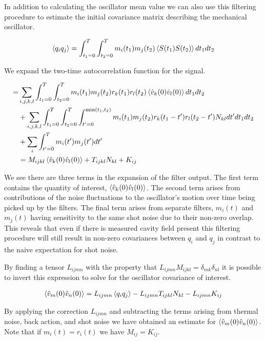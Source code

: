 \documentclass[12pt]{article}
\newcommand{\nn}{\nonumber}
\begin{document}
In addition to calculating the oscillator mean value we can also use this filtering procedure to estimate the initial covariance matrix describing the mechanical oscillator.

\begin{align}
\Braket{q_i q_j} = \int_{t_1=0}^T \int_{t_2=0}^T m_i(t_1)m_j(t_2) \Braket{S(t_1)S(t_2)} dt_1 dt_2
\end{align}

We expand the two-time autocorrelation function for the signal.

\begin{align}
=& \sum_{i,j,k,l} \int_{t_1=0}^T \int_{t_2=0}^T m_i(t_1) m_j(t_2) r_k(t_1) r_l(t_2) \Braket{\hat{v}_k(0) \hat{v}_l(0)} dt_1 dt_2\\
&+ \sum_{i,j,k,l} \int_{t_1=0}^T \int_{t_2=0}^T  \int_{t'=0}^{\text{min}(t_1,t_2)} m_i(t_1) m_j(t_2) r_k(t_1-t') r_l(t_2-t') N_{kl} dt' dt_1 dt_2 \nn\\
&+ \sum_i \int_{t'=0}^T m_i(t')m_j(t') dt' \nn \\
&= M_{ijkl} \Braket{\hat{v}_k(0) \hat{v}_l(0)} +  T_{ijkl}N_{kl} + K_{ij} \nn
\end{align}

We see there are three terms in the expansion of the filter output. The first term contains the quantity of interest, $\Braket{\hat{v}_k(0) \hat{v}_l(0)}$. 
The second term arises from contributions of the noise fluctuations to the oscillator's motion over time being picked up by the filters. 
The final term arises from separate filters, $m_i(t)$ and $m_j(t)$ having sensitivity to the same shot noise due to their non-zero overlap. This reveals that even if there is measured cavity field present this filtering procedure will still result in non-zero covariances between $q_i$ and $q_j$ in contrast to the naive expectation for shot noise.

By finding a tensor $L_{ijmn}$ with the property that $L_{ijmn}M_{ijkl} = \delta_{mk} \delta_{nl}$ it is possible to invert this expression to solve for the oscillator covariance of interest.

\begin{align}
\Braket{\hat{v}_m(0) \hat{v}_n(0)} = L_{ijmn}\Braket{q_i q_j} - L_{ijmn} T_{ijkl} N_{kl} - L_{ijmn}K_{ij}
\end{align}

By applying the correction $L_{ijmn}$ and subtracting the terms arising from thermal noise, back action, and shot noise we have obtained an estimate for $\Braket{\hat{v}_m(0) \hat{v}_n(0)}$. Note that if $m_i(t) = r_i(t)$ we have $M_{ij} = K_{ij}$.
\end{document}
